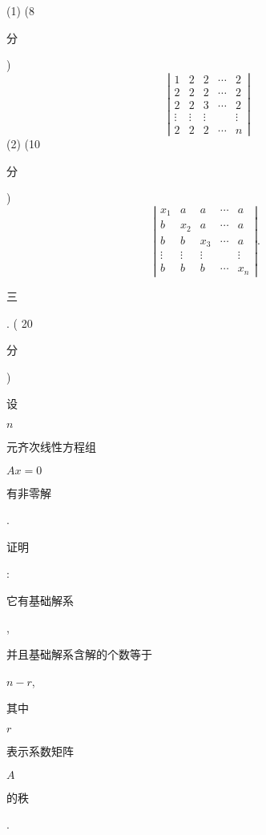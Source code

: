 \documentclass[10pt]{article}
\begin{document}
(1) (8 \begin{CJK}{UTF8}{mj}分\end{CJK})
$$
\left|\begin{array}{ccccc}
1 & 2 & 2 & \cdots & 2 \\
2 & 2 & 2 & \cdots & 2 \\
2 & 2 & 3 & \cdots & 2 \\
\vdots & \vdots & \vdots & & \vdots \\
2 & 2 & 2 & \cdots & n
\end{array}\right|
$$
(2) (10 \begin{CJK}{UTF8}{mj}分\end{CJK})
$$
\left|\begin{array}{ccccc}
x_{1} & a & a & \cdots & a \\
b & x_{2} & a & \cdots & a \\
b & b & x_{3} & \cdots & a \\
\vdots & \vdots & \vdots & & \vdots \\
b & b & b & \cdots & x_{n}
\end{array}\right| \text {. }
$$
\begin{CJK}{UTF8}{mj}三\end{CJK}. ( 20 \begin{CJK}{UTF8}{mj}分\end{CJK}) \begin{CJK}{UTF8}{mj}设\end{CJK} $n$ \begin{CJK}{UTF8}{mj}元齐次线性方程组\end{CJK} $A x=0$ \begin{CJK}{UTF8}{mj}有非零解\end{CJK}. \begin{CJK}{UTF8}{mj}证明\end{CJK}: \begin{CJK}{UTF8}{mj}它有基础解系\end{CJK}, \begin{CJK}{UTF8}{mj}并且基础解系含解的个数等于\end{CJK} $n-r$, \begin{CJK}{UTF8}{mj}其中\end{CJK} $r$ \begin{CJK}{UTF8}{mj}表示系数矩阵\end{CJK} $A$ \begin{CJK}{UTF8}{mj}的秩\end{CJK}.
\end{document}
